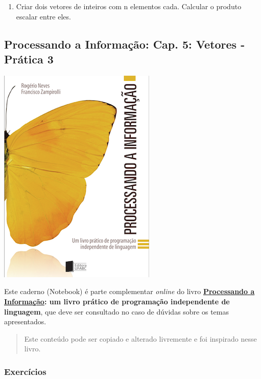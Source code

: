 \documentclass[12pt,a4paper]{article}
\providecommand{\tightlist}{%
      \setlength{\itemsep}{0pt}\setlength{\parskip}{0pt}}
\begin{document}
\begin{enumerate}
\def\labelenumi{\arabic{enumi}.}
\setcounter{enumi}{4}
\tightlist
\item
  Criar dois vetores de inteiros com n elementos cada. Calcular o
  produto escalar entre eles.
\end{enumerate}

    \hypertarget{processando-a-informauxe7uxe3o-cap.-5-vetores---pruxe1tica-3}{%
\subsection{Processando a Informação: Cap. 5: Vetores - Prática
3}\label{processando-a-informauxe7uxe3o-cap.-5-vetores---pruxe1tica-3}}

    \includegraphics{"figs/Capa_Processando_Informacao.jpg"}

Este caderno (Notebook) é parte complementar \emph{online} do livro
\textbf{\href{https://editora.ufabc.edu.br/matematica-e-ciencias-da-computacao/58-processando-a-informacao}{Processando
a Informação}: um livro prático de programação independente de
linguagem}, que deve ser consultado no caso de dúvidas sobre os temas
apresentados.

\begin{quote}
Este conteúdo pode ser copiado e alterado livremente e foi inspirado
nesse livro.
\end{quote}

    \hypertarget{exercuxedcios}{%
\subsubsection{Exercícios}\label{exercuxedcios}}
\end{document}
